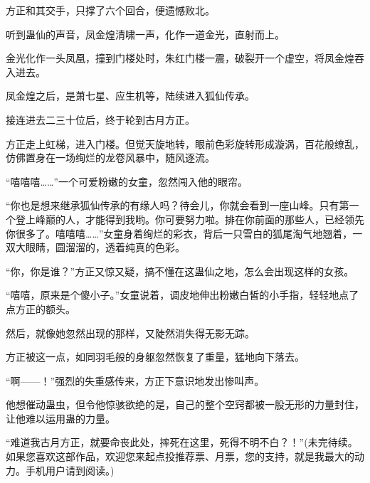 \begin{this_body}
方正和其交手，只撑了六个回合，便遗憾败北。

听到蛊仙的声音，凤金煌清啸一声，化作一道金光，直射而上。

金光化作一头凤凰，撞到门楼处时，朱红门楼一震，破裂开一个虚空，将凤金煌吞入进去。

凤金煌之后，是萧七星、应生机等，陆续进入狐仙传承。

接连进去二三十位后，终于轮到古月方正。

方正走上虹梯，进入门楼。但觉天旋地转，眼前色彩旋转形成漩涡，百花般缭乱，仿佛置身在一场绚烂的龙卷风暴中，随风逐流。

“嘻嘻嘻……”一个可爱粉嫩的女童，忽然闯入他的眼帘。

“你也是想来继承狐仙传承的有缘人吗？待会儿，你就会看到一座山峰。只有第一个登上峰巅的人，才能得到我哟。你可要努力啦。排在你前面的那些人，已经领先你很多了。嘻嘻嘻……”女童身着绚烂的彩衣，背后一只雪白的狐尾淘气地翘着，一双大眼睛，圆溜溜的，透着纯真的色彩。

“你，你是谁？”方正又惊又疑，搞不懂在这蛊仙之地，怎么会出现这样的女孩。

“嘻嘻，原来是个傻小子。”女童说着，调皮地伸出粉嫩白皙的小手指，轻轻地点了点方正的额头。

然后，就像她忽然出现的那样，又陡然消失得无影无踪。

方正被这一点，如同羽毛般的身躯忽然恢复了重量，猛地向下落去。

“啊——！”强烈的失重感传来，方正下意识地发出惨叫声。

他想催动蛊虫，但令他惊骇欲绝的是，自己的整个空窍都被一股无形的力量封住，让他难以运用蛊的力量。

“难道我古月方正，就要命丧此处，摔死在这里，死得不明不白？！”(未完待续。如果您喜欢这部作品，欢迎您来起点投推荐票、月票，您的支持，就是我最大的动力。手机用户请到阅读。)

\end{this_body}


